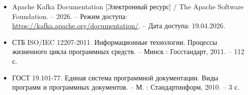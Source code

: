 {\begin{itemize}[leftmargin=2.15cm, labelwidth=0.65cm, labelsep=0.0cm]
		\item[\theimagecntr.] Apache Kafka Documentation [Электронный ресурс] / The Apache Software Foundation. – 2026. – Режим доступа: \url{https://kafka.apache.org/documentation/}. – Дата доступа: 19.04.2026.
		\addtocounter{imagecntr}{1}
		
		\item[\theimagecntr.] СТБ ISO/IEC 12207-2011. Информационные технологии. Процессы жизненного цикла программных средств. – Минск : Госстандарт, 2011. – 112 с.
		\addtocounter{imagecntr}{1}
		
		\item[\theimagecntr.] ГОСТ 19.101-77. Единая система программной документации. Виды программ и программных документов. – М. : Стандартинформ, 2010. – 3 с.
		\addtocounter{imagecntr}{1}
		
	\end{itemize}
}